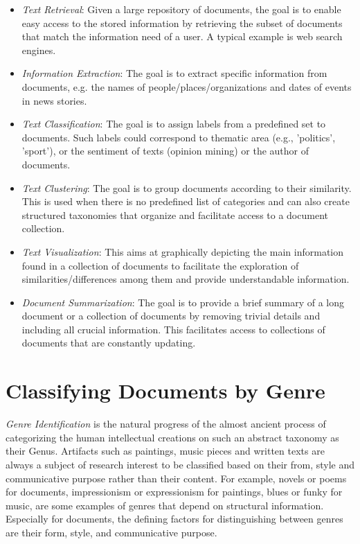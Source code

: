\begin{itemize}
\item \textit{Text Retrieval}: Given a large repository of documents, the goal is to enable easy access to the stored information by retrieving the subset of documents that match the information need of a user. A typical example is web search engines.
\item \textit{Information Extraction}: The goal is to extract specific information from documents, e.g. the names of people/places/organizations and dates of events in news stories.
\item \textit{Text Classification}: The goal is to assign labels from a predefined set to documents. Such labels could correspond to thematic area (e.g., 'politics', 'sport'), or the sentiment of texts (opinion mining) or the author of documents.
\item \textit{Text Clustering}: The goal is to group documents according to their similarity. This is used when there is no predefined list of categories and can also create structured taxonomies that organize and facilitate access to a document collection.
\item \textit{Text Visualization}: This aims at graphically depicting the main information found in a collection of documents to facilitate the exploration of similarities/differences among them and provide understandable information.
\item \textit{Document Summarization}: The goal is to provide a brief summary of a long document or a collection of documents by removing trivial details and including all crucial information. This facilitates access to collections of documents that are constantly updating. 
\end{itemize}

\section{Classifying Documents by Genre} \label{chap:introduction:sec:classifying_by_genre}

\textit{Genre Identification} is the natural progress of the almost ancient process of categorizing the human intellectual creations on such an abstract taxonomy as their Genus. Artifacts such as paintings, music pieces and written texts are always a subject of research interest to be classified based on their from, style and communicative purpose rather than their content. For example, novels or poems for documents, impressionism or expressionism for paintings, blues or funky for music, are some examples of genres that depend on structural information. Especially for documents, the defining factors for distinguishing between genres are their form, style, and communicative purpose.

